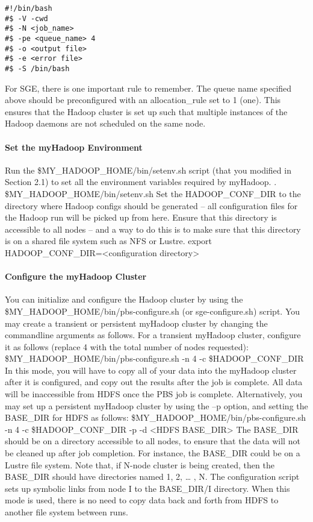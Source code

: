 \begin{verbatim}
#!/bin/bash
#$ -V -cwd
#$ -N <job_name>
#$ -pe <queue_name> 4
#$ -o <output file>
#$ -e <error file>
#$ -S /bin/bash
\end{verbatim}

For SGE, there is one important rule to remember. The queue name specified above
should be preconfigured with an allocation\_rule set to 1 (one). This ensures that the
Hadoop cluster is set up such that multiple instances of the Hadoop daemons are not
scheduled on the same node.

\paragraph{Set the myHadoop Environment}

Run the \$MY\_HADOOP\_HOME/bin/setenv.sh script (that you modified in Section 2.1)
to set all the environment variables required by myHadoop.
. \$MY\_HADOOP\_HOME/bin/setenv.sh
Set the HADOOP\_CONF\_DIR to the directory where Hadoop configs should be
generated – all configuration files for the Hadoop run will be picked up from here. Ensure
that this directory is accessible to all nodes – and a way to do this is to make sure that this
directory is on a shared file system such as NFS or Lustre.
export HADOOP\_CONF\_DIR=<configuration directory>

\paragraph{Configure the myHadoop Cluster}

You can initialize and configure the Hadoop cluster by using the
\$MY\_HADOOP\_HOME/bin/pbs-configure.sh (or sge-configure.sh) script. You may
create a transient or persistent myHadoop cluster by changing the commandline
arguments as follows.
For a transient myHadoop cluster, configure it as follows (replace 4 with the total number
of nodes requested):
\$MY\_HADOOP\_HOME/bin/pbs-configure.sh -n 4 -c \$HADOOP\_CONF\_DIR
In this mode, you will have to copy all of your data into the myHadoop cluster after it is
configured, and copy out the results after the job is complete. All data will be
inaccessible from HDFS once the PBS job is complete.
Alternatively, you may set up a persistent myHadoop cluster by using the –p option, and
setting the BASE\_DIR for HDFS as follows:
\$MY\_HADOOP\_HOME/bin/pbs-configure.sh -n 4 -c \$HADOOP\_CONF\_DIR -p -d
<HDFS BASE\_DIR>
The BASE\_DIR should be on a directory accessible to all nodes, to ensure that the data
will not be cleaned up after job completion. For instance, the BASE\_DIR could be on a
Lustre file system. Note that, if N-node cluster is being created, then the BASE\_DIR
should have directories named 1, 2, … , N. The configuration script sets up symbolic
links from node I to the BASE\_DIR/I directory. When this mode is used, there is no need
to copy data back and forth from HDFS to another file system between runs.

